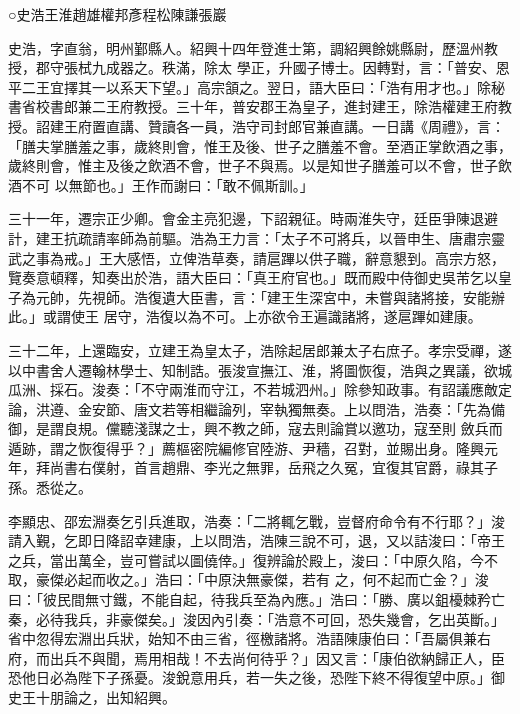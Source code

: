 
\begin{pinyinscope}

 ○史浩王淮趙雄權邦彥程松陳謙張巖



 史浩，字直翁，明州鄞縣人。紹興十四年登進士第，調紹興餘姚縣尉，歷溫州教授，郡守張栻九成器之。秩滿，除太
 學正，升國子博士。因轉對，言：「普安、恩平二王宜擇其一以系天下望。」高宗頷之。翌日，語大臣曰：「浩有用才也。」除秘書省校書郎兼二王府教授。三十年，普安郡王為皇子，進封建王，除浩權建王府教授。詔建王府置直講、贊讀各一員，浩守司封郎官兼直講。一日講《周禮》，言：「膳夫掌膳羞之事，歲終則會，惟王及後、世子之膳羞不會。至酒正掌飲酒之事，歲終則會，惟主及後之飲酒不會，世子不與焉。以是知世子膳羞可以不會，世子飲酒不可
 以無節也。」王作而謝曰：「敢不佩斯訓。」



 三十一年，遷宗正少卿。會金主亮犯邊，下詔親征。時兩淮失守，廷臣爭陳退避計，建王抗疏請率師為前驅。浩為王力言：「太子不可將兵，以晉申生、唐肅宗靈武之事為戒。」王大感悟，立俾浩草奏，請扈蹕以供子職，辭意懇到。高宗方怒，覽奏意頓釋，知奏出於浩，語大臣曰：「真王府官也。」既而殿中侍御史吳芾乞以皇子為元帥，先視師。浩復遺大臣書，言：「建王生深宮中，未嘗與諸將接，安能辦此。」或謂使王
 居守，浩復以為不可。上亦欲令王遍識諸將，遂扈蹕如建康。



 三十二年，上還臨安，立建王為皇太子，浩除起居郎兼太子右庶子。孝宗受禪，遂以中書舍人遷翰林學士、知制誥。張浚宣撫江、淮，將圖恢復，浩與之異議，欲城瓜洲、採石。浚奏：「不守兩淮而守江，不若城泗州。」除參知政事。有詔議應敵定論，洪遵、金安節、唐文若等相繼論列，宰執獨無奏。上以問浩，浩奏：「先為備御，是謂良規。儻聽淺謀之士，興不教之師，寇去則論賞以邀功，寇至則
 斂兵而遁跡，謂之恢復得乎？」薦樞密院編修官陸游、尹穡，召對，並賜出身。隆興元年，拜尚書右僕射，首言趙鼎、李光之無罪，岳飛之久冤，宜復其官爵，祿其子孫。悉從之。



 李顯忠、邵宏淵奏乞引兵進取，浩奏：「二將輒乞戰，豈督府命令有不行耶？」浚請入覲，乞即日降詔幸建康，上以問浩，浩陳三說不可，退，又以詰浚曰：「帝王之兵，當出萬全，豈可嘗試以圖僥倖。」復辨論於殿上，浚曰：「中原久陷，今不取，豪傑必起而收之。」浩曰：「中原決無豪傑，若有
 之，何不起而亡金？」浚曰：「彼民間無寸鐵，不能自起，待我兵至為內應。」浩曰：「勝、廣以鉏櫌棘矜亡秦，必待我兵，非豪傑矣。」浚因內引奏：「浩意不可回，恐失幾會，乞出英斷。」省中忽得宏淵出兵狀，始知不由三省，徑檄諸將。浩語陳康伯曰：「吾屬俱兼右府，而出兵不與聞，焉用相哉！不去尚何待乎？」因又言：「康伯欲納歸正人，臣恐他日必為陛下子孫憂。浚銳意用兵，若一失之後，恐陛下終不得復望中原。」御史王十朋論之，出知紹興。




\end{pinyinscope}

